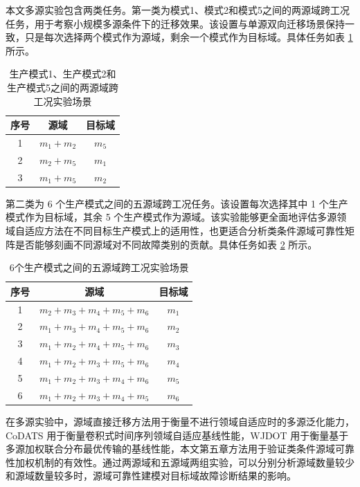 \documentclass{seuthesis-2022}
\begin{document}
本文多源实验包含两类任务。第一类为模式1、模式2和模式5之间的两源域跨工况任务，用于考察小规模多源条件下的迁移效果。该设置与单源双向迁移场景保持一致，只是每次选择两个模式作为源域，剩余一个模式作为目标域。具体任务如表 \ref{tab:two_source_tasks} 所示。

\begin{table}[!htbp]
    \centering
    \caption{生产模式1、生产模式2和生产模式5之间的两源域跨工况实验场景}
    \label{tab:two_source_tasks}
    \begin{tabular}{c c c}
        \toprule
        序号 & 源域 & 目标域 \\
        \midrule
        1 & $m_1 + m_2$ & $m_5$ \\
        2 & $m_2 + m_5$ & $m_1$ \\
        3 & $m_1 + m_5$ & $m_2$ \\
        \bottomrule
    \end{tabular}
\end{table}

第二类为 6 个生产模式之间的五源域跨工况任务。该设置每次选择其中 1 个生产模式作为目标域，其余 5 个生产模式作为源域。该实验能够更全面地评估多源领域自适应方法在不同目标生产模式上的适用性，也更适合分析类条件源域可靠性矩阵是否能够刻画不同源域对不同故障类别的贡献。具体任务如表 \ref{tab:five_source_tasks} 所示。

\begin{table}[!htbp]
    \centering
    \caption{6个生产模式之间的五源域跨工况实验场景}
    \label{tab:five_source_tasks}
    \begin{tabular}{c c c}
        \toprule
        序号 & 源域 & 目标域 \\
        \midrule
        1 & $m_2 + m_3 + m_4 + m_5 + m_6$ & $m_1$ \\
        2 & $m_1 + m_3 + m_4 + m_5 + m_6$ & $m_2$ \\
        3 & $m_1 + m_2 + m_4 + m_5 + m_6$ & $m_3$ \\
        4 & $m_1 + m_2 + m_3 + m_5 + m_6$ & $m_4$ \\
        5 & $m_1 + m_2 + m_3 + m_4 + m_6$ & $m_5$ \\
        6 & $m_1 + m_2 + m_3 + m_4 + m_5$ & $m_6$ \\
        \bottomrule
    \end{tabular}
\end{table}

在多源实验中，源域直接迁移方法用于衡量不进行领域自适应时的多源泛化能力，CoDATS 用于衡量卷积式时间序列领域自适应基线性能，WJDOT 用于衡量基于多源加权联合分布最优传输的基线性能，本文第五章方法用于验证类条件源域可靠性加权机制的有效性。通过两源域和五源域两组实验，可以分别分析源域数量较少和源域数量较多时，源域可靠性建模对目标域故障诊断结果的影响。
\end{document}
